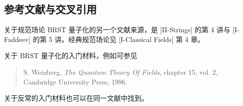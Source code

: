 \subsection{参考文献与交叉引用}

关于规范场论 BRST 量子化的另一个文献来源，是 [II-Strings] 的第 4 讲与 [I-Faddeev] 的第 5 讲。经典规范场论见 [I-Classical Fields] 第 4 章。


关于 BRST 量子化的入门材料，例如可参见

\begin{quote}
S. Weinberg, \textit{The Quantum Theory Of Fields}, chapter 15, vol. 2, Cambridge University Press, 1996.
\end{quote}

关于反常的入门材料也可以在同一文献中找到。
